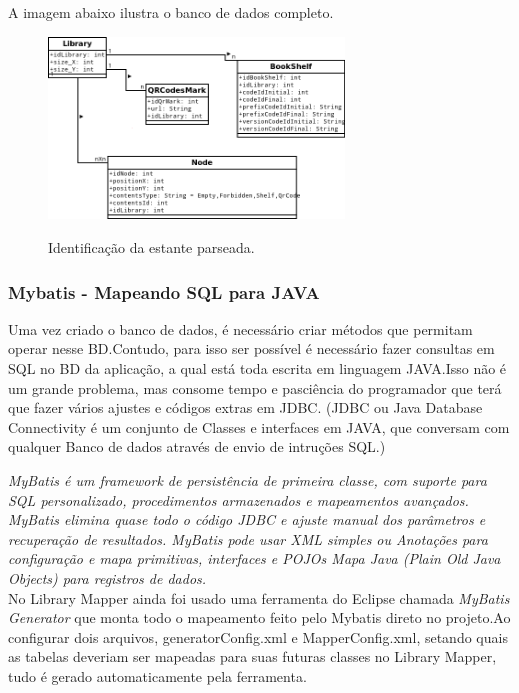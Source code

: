 \documentclass[a4paper,10pt]{article}
\begin{document}
	A imagem abaixo ilustra o banco de dados completo.
\begin{figure}[H]
	\centering

	\includegraphics[width=0.70\textwidth]{./imgs/merLibraryMappper.png}\\[1cm]	
	\caption{Identificação da estante parseada.}
	\label{total}
\end{figure}

	\subsubsection{Mybatis - Mapeando SQL para JAVA}
	
	Uma vez criado o banco de dados, é necessário criar métodos que permitam operar nesse BD.Contudo, para isso ser possível
	é necessário fazer consultas em SQL no BD da aplicação, a qual está toda escrita em linguagem JAVA.Isso não é um grande 
	problema, mas consome tempo e pasciência do programador que terá que fazer vários ajustes e códigos extras em JDBC.
	(JDBC ou Java Database Connectivity é um conjunto de Classes e interfaces em JAVA, que conversam com qualquer Banco de dados através 
	de envio de intruções SQL.)
	
	{\it MyBatis é um framework de persistência de primeira classe, com 
	suporte para SQL personalizado, procedimentos armazenados e mapeamentos avançados. 
	MyBatis elimina quase todo o código JDBC e ajuste manual dos parâmetros e recuperação 
	de resultados. MyBatis pode usar XML simples ou Anotações para configuração e mapa primitivas,
	 interfaces e POJOs Mapa Java (Plain Old Java Objects) para registros de dados.}\cite{mybatis}\\

	No Library Mapper ainda foi usado uma ferramenta do Eclipse chamada {\it MyBatis Generator} que monta todo o mapeamento 
	feito pelo Mybatis direto no projeto.Ao configurar dois arquivos, generatorConfig.xml e MapperConfig.xml, setando quais as
	tabelas deveriam ser mapeadas para suas futuras classes no Library Mapper, tudo é gerado automaticamente pela ferramenta.\\
\end{document}
